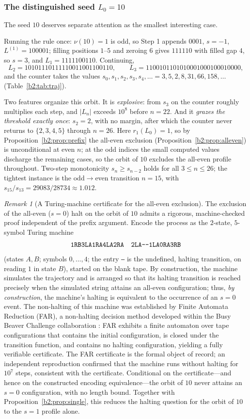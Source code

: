 \documentclass[a4paper]{article}
\theoremstyle{plain}
\theoremstyle{definition}
\theoremstyle{remark}
\newtheorem{remark}{Remark}[subsection]
\begin{document}
\subsubsection{The distinguished seed $L_0=10$}\label{b2:sec:seed10}
The seed $10$ deserves separate attention as the smallest interesting case.

Running the rule once: $\nu(10)=1$ is odd, so Step 1 appends $0001$, $s=-1$, $L^{(1)}=100001$; filling positions $1$--$5$ and zeroing $6$ gives $111110$ with filled gap $4$, so $s=3$, and $L_1=1111100110$. Continuing,
\[ L_2=10101110111110011001100110,\qquad L_3=1100101101010001000100010000, \]
and the counter takes the values $s_0,s_1,s_2,s_3,s_4,\dots=3,5,2,8,31,66,158,\dots$ (Table~\ref{b2:tab:traj}).

Two features organize this orbit. It is \emph{explosive}: from $s_3$ on the counter roughly multiplies each step, and $|L_n|$ exceeds $10^8$ before $n=22$. And it \emph{grazes the threshold exactly once}: $s_2=2$, with no margin, after which the counter never returns to $\{2,3,4,5\}$ through $n=26$. Here $r_1(L_0)=1$, so by Proposition~\ref{b2:prop:prefix} the all-even exclusion (Proposition~\ref{b2:prop:alleven}) is unconditional at even $n$; at the odd indices the small computed values discharge the remaining cases, so the orbit of $10$ excludes the all-even profile throughout. Two-step monotonicity $s_n\ge s_{n-2}$ holds for all $3\le n\le 26$; the tightest instance is the odd$\to$even transition $n=15$, with $s_{15}/s_{13}=29083/28734\approx 1.012$.

\begin{remark}[A Turing-machine certificate for the all-even exclusion]\label{b2:rem:TM}
The exclusion of the all-even ($s=0$) halt on the orbit of $10$ admits a rigorous, machine-checked proof independent of the prefix argument. Encode the process as the $2$-state, $5$-symbol Turing machine
\[ \texttt{1RB3LA1RA4LA2RA\quad 2LA---1LA0RA3RB} \]
(states $A,B$; symbols $0,\dots,4$; the entry \texttt{---} is the undefined, halting transition, on reading $1$ in state $B$), started on the blank tape. By construction, the machine simulates the trajectory and is arranged so that its halting transition is reached precisely when the simulated string attains an all-even configuration; thus, \emph{by construction}, the machine's halting is equivalent to the occurrence of an $s=0$ event. The non-halting of this machine was established by Finite Automata Reduction (FAR), a non-halting decision method developed within the Busy Beaver Challenge collaboration \cite{b2:bbc}: FAR exhibits a finite automaton over tape configurations that contains the initial configuration, is closed under the transition function, and contains no halting configuration, yielding a fully verifiable certificate. The FAR certificate is the formal object of record; an independent reproduction confirmed that the machine runs without halting for $10^7$ steps, consistent with the certificate. Conditional on the certificate---and hence on the constructed encoding equivalence---the orbit of $10$ never attains an $s=0$ configuration, with no length bound. Together with Proposition~\ref{b2:prop:single}, this reduces the halting question for the orbit of $10$ to the $s=1$ profile alone.
\end{remark}
\end{document}
